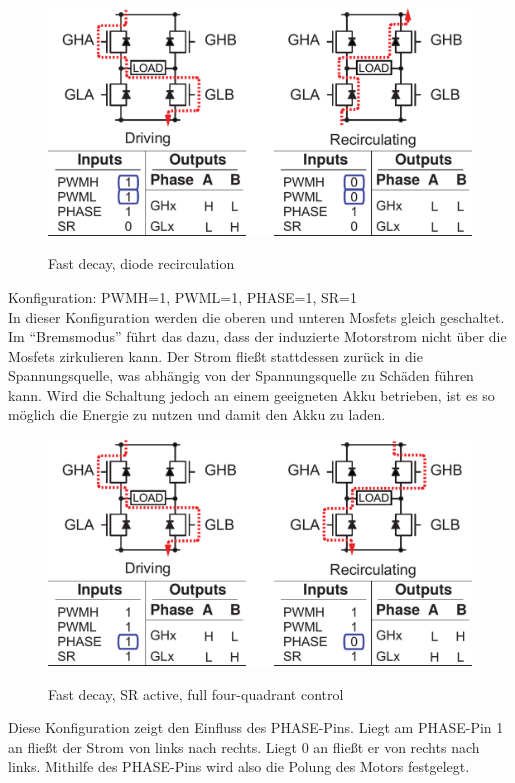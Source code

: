 \begin{figure}[H]
\centering
\includegraphics[width=.8\textwidth]{3941_4.png}\\
\caption{Fast decay, diode recirculation}%
\label{fig:39414}
\end{figure}


Konfiguration: PWMH=1, PWML=1, PHASE=1, SR=1\\
In dieser Konfiguration werden die oberen und unteren Mosfets gleich geschaltet. Im
``Bremsmodus'' führt das dazu, dass der induzierte Motorstrom nicht über die Mosfets
zirkulieren kann. Der Strom fließt stattdessen zurück in die Spannungsquelle, was
abhängig von der Spannungsquelle zu Schäden führen kann. Wird die Schaltung jedoch an
einem geeigneten Akku betrieben, ist es so möglich die Energie zu nutzen und damit den Akku
zu laden.

\begin{figure}[H]
\centering
\includegraphics[width=.8\textwidth]{3941_5.png}\\
\caption{Fast decay, SR active, full four-quadrant control}%
\label{fig:39415}
\end{figure}

Diese Konfiguration zeigt den Einfluss des PHASE-Pins. Liegt am PHASE-Pin 1 an
fließt der Strom von links nach rechts. Liegt 0 an fließt er von rechts nach links.
Mithilfe des PHASE-Pins wird also die Polung des Motors festgelegt.


